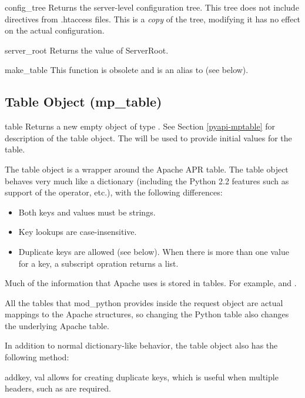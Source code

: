 \begin{funcdesc}{config_tree}{}
  Returns the server-level configuration tree. This tree does not
  include directives from .htaccess files. This is a \emph{copy} of
  the tree, modifying it has no effect on the actual configuration.
\end{funcdesc}

\begin{funcdesc}{server_root}{}
  Returns the value of ServerRoot.
\end{funcdesc}

\begin{funcdesc}{make_table}{} 
  This function is obsolete and is an alias to  (see below).
\end{funcdesc}

\subsection{Table Object (mp_table)\label{pyapi-mptable}}

\begin{classdesc}{table}{}
  Returns a new empty object of type . See Section
  \ref{pyapi-mptable} for description of the table object. The
   will be used to provide initial values for
  the table.  

  The table object is a wrapper around the Apache APR table. The table
  object behaves very much like a dictionary (including the Python 2.2
  features such as support of the  operator, etc.), with the 
  following differences:

  \begin{itemize}
  \item
    Both keys and values must be strings.
  \item
    Key lookups are case-insensitive.
  \item
    Duplicate keys are allowed (see  below). When there is
    more than one value for a key, a subscript opration returns a list.
  \end{itemize}

  Much of the information that Apache uses is stored in tables. For
  example,  and .

  All the tables that mod_python provides inside the request
  object are actual mappings to the Apache structures, so changing the
  Python table also changes the underlying Apache table.

  In addition to normal dictionary-like behavior, the table object also
  has the following method:

  \begin{methoddesc}[table]{add}{key, val}
     allows for creating duplicate keys, which is useful 
    when multiple headers, such as  are required.
  \end{methoddesc}

\end{classdesc}


